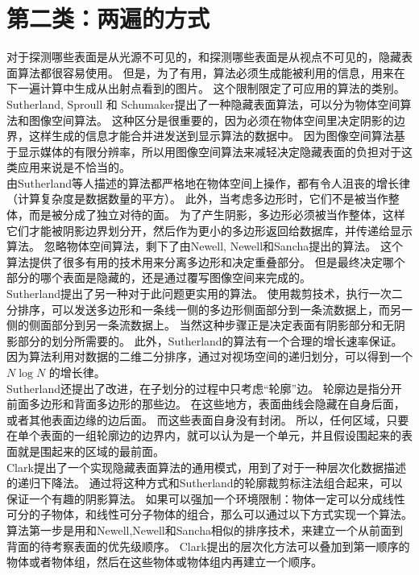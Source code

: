 \section{第二类：两遍的方式}
对于探测哪些表面是从光源不可见的，和探测哪些表面是从视点不可见的，隐藏表面算法都很容易使用。
但是，为了有用，算法必须生成能被利用的信息，用来在下一遍计算中生成从出射点看到的图片。
这个限制限定了可应用的算法的类别。\\
Sutherland, Sproull 和 Schumaker提出了一种隐藏表面算法，可以分为物体空间算法和图像空间算法\cite{12}。
这种区分是很重要的，因为必须在物体空间里决定阴影的边界，这样生成的信息才能合并进发送到显示算法的数据中。
因为图像空间算法基于显示媒体的有限分辨率，所以用图像空间算法来减轻决定隐藏表面的负担对于这类应用来说是不恰当的。\\
由Sutherland等人描述的算法\cite{12}都严格地在物体空间上操作，都有令人沮丧的增长律（计算复杂度是数据数量的平方）。
此外，当考虑多边形时，它们不是被当作整体，而是被分成了独立对待的面。
为了产生阴影，多边形必须被当作整体，这样它们才能被阴影边界划分开，然后作为更小的多边形返回给数据库，并传递给显示算法。
忽略物体空间算法，剩下了由Newell, Newell和Sancha提出的算法\cite{9}。
这个算法提供了很多有用的技术用来分离多边形和决定重叠部分。
但是最终决定哪个部分的哪个表面是隐藏的，还是通过覆写图像空间来完成的。\\
Sutherland提出了另一种对于此问题更实用的算法\cite{11}。
使用裁剪技术，执行一次二分排序，可以发送多边形和一条线一侧的多边形侧面部分到一条流数据上，而另一侧的侧面部分到另一条流数据上。
当然这种步骤正是决定表面有阴影部分和无阴影部分的划分所需要的。
此外，Sutherland的算法有一个合理的增长速率保证。
因为算法利用对数据的二维二分排序，通过对视场空间的递归划分，可以得到一个$ N\log N $ 的增长律。\\
Sutherland还提出了改进，在子划分的过程中只考虑“轮廓”边。
轮廓边是指分开前面多边形和背面多边形的那些边。
在这些地方，表面曲线会隐藏在自身后面，或者其他表面边缘的边后面。
而这些表面自身没有封闭\cite{1}。
所以，任何区域，只要在单个表面的一组轮廓边的边界内，就可以认为是一个单元，并且假设围起来的表面就是围起来的区域的最前面。\\
Clark提出了一个实现隐藏表面算法的通用模式，用到了对于一种层次化数据描述的递归下降法\cite{7}。
通过将这种方式和Sutherland的轮廓裁剪标注法组合起来，可以保证一个有趣的阴影算法。
如果可以强加一个环境限制：物体一定可以分成线性可分的子物体，和线性可分子物体的组合，那么可以通过以下方式实现一个算法。\\
算法第一步是用和Newell,Newell和Sancha相似的排序技术，来建立一个从前面到背面的待考察表面的优先级顺序。
Clark提出的层次化方法可以叠加到第一顺序的物体或者物体组，然后在这些物体或物体组内再建立一个顺序。

